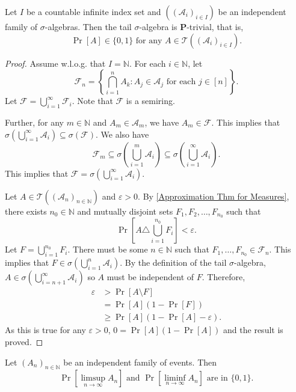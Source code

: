 \begin{ftheo}
    Let $I$ be a countable infinite index set and $((\mathcal{A}_i)_{i\in I})$ be an independent family of $\sigma$-algebras. Then the tail $\sigma$-algebra is $\textbf{P}$-trivial, that is,
    $$\Pr[A]\in\{0,1\}\text{ for any }A\in\mathcal{T}((\mathcal{A}_i)_{i\in I}).$$
\end{ftheo}
\begin{proof}
    Assume w.l.o.g. that $I=\mathbb{N}$. For each $i\in\mathbb{N}$, let
    $$\mathcal{F}_n = \left\{\bigcap_{i=1}^n A_k: A_j\in\mathcal{A}_j\text{ for each }j\in[n]\right\}.$$
    Let $\mathcal{F}=\bigcup_{i=1}^\infty \mathcal{F}_i$. Note that $\mathcal{F}$ is a semiring.
    
    \vspace{1mm}
    Further, for any $m\in\mathbb{N}$ and $A_m\in\mathcal{A}_m$, we have $A_m\in\mathcal{F}$. This implies that $\sigma\left(\bigcup_{i=1}^\infty \mathcal{A}_i\right)\subseteq\sigma(\mathcal{F})$. We also have
    $$\mathcal{F}_m\subseteq\sigma\left(\bigcup_{i=1}^m \mathcal{A}_i\right)\subseteq\sigma\left(\bigcup_{i=1}^\infty \mathcal{A}_i\right).$$
    This implies that $\mathcal{F} = \sigma\left(\bigcup_{i=1}^\infty \mathcal{A}_i\right)$.
    
    Let $A\in\mathcal{T}((\mathcal{A}_n)_{n\in\mathbb{N}})$ and $\varepsilon>0$. By \cref{Approximation Thm for Measures}, there exists $n_0\in\mathbb{N}$ and mutually disjoint sets $F_1,F_2,\ldots,F_{n_0}$ such that $$\Pr\left[A\triangle \bigcup_{i=1}^{n_0}F_i\right]<\varepsilon.$$
    Let $F=\bigcup_{i=1}^{n_0}F_i$. There must be some $n\in\mathbb{N}$ such that $F_1,\ldots,F_{n_0}\in \mathcal{F}_n$. This implies that $F\in\sigma(\bigcup_{i=1}^n \mathcal{A}_i)$. By the definition of the tail $\sigma$-algebra, $A\in\sigma(\bigcup_{i=n+1}^\infty\mathcal{A}_i)$ so $A$ must be independent of $F$. Therefore,
    \begin{align*}
        \varepsilon &> \Pr[A\setminus F] \\
        &= \Pr[A](1-\Pr[F]) \\
        &\geq \Pr[A](1-\Pr[A]-\varepsilon).
    \end{align*}
    As this is true for any $\varepsilon>0$, $0=\Pr[A](1-\Pr[A])$ and the result is proved.
\end{proof}

\begin{corollary}
    Let $(A_n)_{n\in\mathbb{N}}$ be an independent family of events. Then
    $$\Pr\left[\limsup_{n\to\infty} A_n\right]\text{ and }\Pr\left[\liminf_{n\to\infty} A_n\right]\text{ are in }\{0,1\}.$$
\end{corollary}

